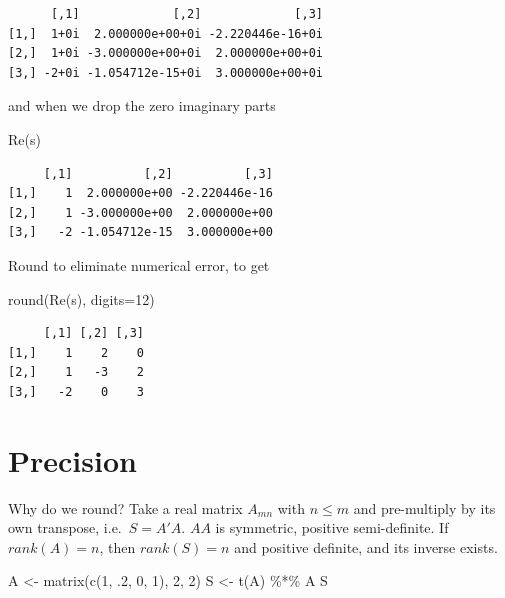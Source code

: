 \documentclass[
  letterpaper,
]{book}
\newenvironment{Shaded}{\begin{snugshade}}{\end{snugshade}}
\newcommand{\AttributeTok}[1]{\textcolor[rgb]{0.40,0.45,0.13}{#1}}
\newcommand{\DecValTok}[1]{\textcolor[rgb]{0.68,0.00,0.00}{#1}}
\newcommand{\FunctionTok}[1]{\textcolor[rgb]{0.28,0.35,0.67}{#1}}
\newcommand{\NormalTok}[1]{\textcolor[rgb]{0.00,0.23,0.31}{#1}}
\newcommand{\OtherTok}[1]{\textcolor[rgb]{0.00,0.23,0.31}{#1}}
\newcommand{\SpecialCharTok}[1]{\textcolor[rgb]{0.37,0.37,0.37}{#1}}
\begin{document}
\begin{verbatim}
      [,1]             [,2]             [,3]
[1,]  1+0i  2.000000e+00+0i -2.220446e-16+0i
[2,]  1+0i -3.000000e+00+0i  2.000000e+00+0i
[3,] -2+0i -1.054712e-15+0i  3.000000e+00+0i
\end{verbatim}

and when we drop the zero imaginary parts

\begin{Shaded}
\begin{Highlighting}[]
\FunctionTok{Re}\NormalTok{(s)}
\end{Highlighting}
\end{Shaded}

\begin{verbatim}
     [,1]          [,2]          [,3]
[1,]    1  2.000000e+00 -2.220446e-16
[2,]    1 -3.000000e+00  2.000000e+00
[3,]   -2 -1.054712e-15  3.000000e+00
\end{verbatim}

Round to eliminate numerical error, to get

\begin{Shaded}
\begin{Highlighting}[]
\FunctionTok{round}\NormalTok{(}\FunctionTok{Re}\NormalTok{(s), }\AttributeTok{digits=}\DecValTok{12}\NormalTok{)}
\end{Highlighting}
\end{Shaded}

\begin{verbatim}
     [,1] [,2] [,3]
[1,]    1    2    0
[2,]    1   -3    2
[3,]   -2    0    3
\end{verbatim}

\hypertarget{precision}{%
\section{Precision}\label{precision}}

Why do we round? Take a real matrix \(A_{mn}\) with \(n \le m\) and
pre-multiply by its own transpose, i.e.~\(S = A'A\). \(AA\) is
symmetric, positive semi-definite. If \(rank(A) = n\), then
\(rank(S) = n\) and positive definite, and its inverse exists.

\begin{Shaded}
\begin{Highlighting}[]
\NormalTok{A  }\OtherTok{\textless{}{-}} \FunctionTok{matrix}\NormalTok{(}\FunctionTok{c}\NormalTok{(}\DecValTok{1}\NormalTok{, .}\DecValTok{2}\NormalTok{, }\DecValTok{0}\NormalTok{, }\DecValTok{1}\NormalTok{), }\DecValTok{2}\NormalTok{, }\DecValTok{2}\NormalTok{)}
\NormalTok{S }\OtherTok{\textless{}{-}} \FunctionTok{t}\NormalTok{(A) }\SpecialCharTok{\%*\%}\NormalTok{ A}
\NormalTok{S}
\end{Highlighting}
\end{Shaded}
\end{document}
